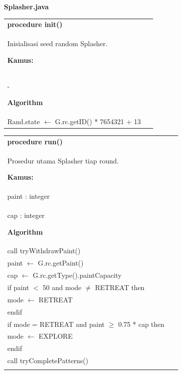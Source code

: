 \documentclass{article}
\newenvironment{pseudobox}
{
\centering
\begin{longtable}{|p{0.94\linewidth}|}
\hline
}
{
\\ \hline
\end{longtable}
\vspace{0.05cm}
}
\begin{document}
\item \textbf{Splasher.java}

\begin{pseudobox}
\textbf{procedure init()} \\
{ Inisialisasi seed random Splasher. }

\textbf{Kamus:} \\
\hspace*{1em} -

\textbf{Algorithm} \\
\hspace*{1em} Rand.state $\leftarrow$ G.rc.getID() * 7654321 + 13
\end{pseudobox}

\begin{pseudobox}
\textbf{procedure run()} \\
{ Prosedur utama Splasher tiap round. }

\textbf{Kamus:} \\
\hspace*{1em} paint : integer \\
\hspace*{1em} cap : integer

\textbf{Algorithm} \\
\hspace*{1em} call tryWithdrawPaint() \\

\hspace*{1em} paint $\leftarrow$ G.rc.getPaint() \\
\hspace*{1em} cap $\leftarrow$ G.rc.getType().paintCapacity \\

\hspace*{1em} if paint $<$ 50 and mode $\neq$ RETREAT then \\
\hspace*{2em} mode $\leftarrow$ RETREAT \\
\hspace*{1em} endif \\

\hspace*{1em} if mode = RETREAT and paint $\geq$ 0.75 * cap then \\
\hspace*{2em} mode $\leftarrow$ EXPLORE \\
\hspace*{1em} endif \\

\hspace*{1em} call tryCompletePatterns() \\


\end{pseudobox}
\end{document}
